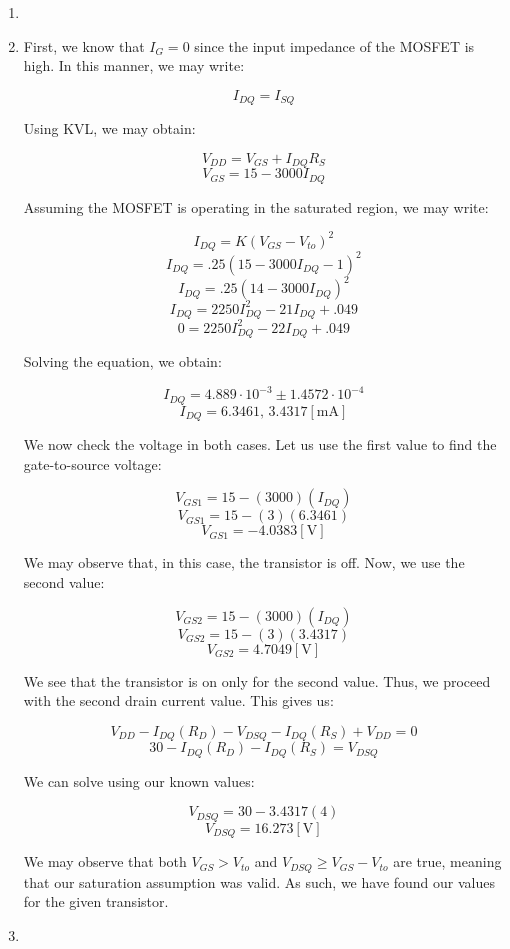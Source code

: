 \begin{enumerate}

  \item

  \item First, we know that $I_G=0$ since the input impedance of the MOSFET is high. In this manner, we may write:

    $$I_{DQ}=I_{SQ}$$

    Using KVL, we may obtain:

    $$V_{DD}=V_{GS}+I_{DQ}R_S$$
    $$V_{GS}=15-3000I_{DQ}$$

    Assuming the MOSFET is operating in the saturated region, we may write:

    $$I_{DQ}=K(V_{GS}-V_{to})^2$$
    $$I_{DQ}=.25(15-3000I_{DQ}-1)^2$$
    $$I_{DQ}=.25(14-3000I_{DQ})^2$$
    $$I_{DQ}=2250I_{DQ}^2-21I_{DQ}+.049$$
    $$0=2250I_{DQ}^2-22I_{DQ}+.049$$

    Solving the equation, we obtain:

    $$I_{DQ}=4.889\cdot10^{-3}\pm1.4572\cdot10^{-4}$$
    $$\boxed{I_{DQ}=6.3461,\,3.4317[\si{\milli\ampere}]}$$

    We now check the voltage in both cases. Let us use the first value to find the gate-to-source voltage:

    $$V_{GS1}=15-(3000)(I_{DQ})$$
    $$V_{GS1}=15-(3)(6.3461)$$
    $$\boxed{V_{GS1}=-4.0383[\si{\volt}]}$$

    We may observe that, in this case, the transistor is off. Now, we use the second value:

    $$V_{GS2}=15-(3000)(I_{DQ})$$
    $$V_{GS2}=15-(3)(3.4317)$$
    $$\boxed{V_{GS2}=4.7049[\si{\volt}]}$$

    We see that the transistor is on only for the second value. Thus, we proceed with the second drain current value. This gives us:

    $$V_{DD}-I_{DQ}(R_D)-V_{DSQ}-I_{DQ}(R_S)+V_{DD}=0$$
    $$30-I_{DQ}(R_D)-I_{DQ}(R_S)=V_{DSQ}$$

    We can solve using our known values:

    $$V_{DSQ}=30-3.4317(4)$$
    $$\boxed{V_{DSQ}=16.273[\si{\volt}]}$$

    We may observe that both $V_{GS}>V_{to}$ and $V_{DSQ}\geq V_{GS}-V_{to}$ are true, meaning that our saturation assumption was valid. As such, we have found our values for the given transistor.

  \item

\end{enumerate}



